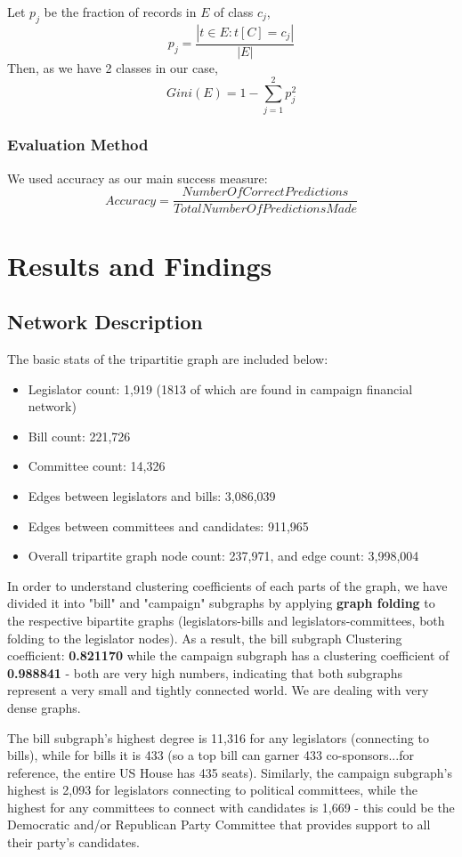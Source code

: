 \documentclass[12pt,twocolumn]{article}
\begin{document}
Let $p_j$ be the fraction of records in $E$ of class $c_j$, $$p_j = \frac{|{t\in E: t[C] = c_j}|}{|E|}$$
Then, as we have 2 classes in our case, $$Gini(E) = 1- \sum_{j=1}^{2}p^2_j$$

\subsubsection{Evaluation Method}
We used accuracy as our main success measure: $$Accuracy = \frac{NumberOfCorrectPredictions}{TotalNumberOfPredictionsMade}$$

\section{Results and Findings}
\subsection{Network Description}
The basic stats of the tripartitie graph are included below: 
\begin{itemize}
\item Legislator count: 1,919 (1813 of which are found in campaign financial network)
\item Bill count: 221,726 
\item Committee count: 14,326
\item Edges between legislators and bills: 3,086,039
\item Edges between committees and candidates: 911,965
\item Overall tripartite graph node count: 237,971, and edge count: 3,998,004
\end{itemize}

In order to understand clustering coefficients of each parts of the graph, we have divided it into "bill" and "campaign" subgraphs by applying \textbf{graph folding} to the respective bipartite graphs (legislators-bills and legislators-committees, both folding to the legislator nodes). As a result, the bill subgraph Clustering coefficient: \textbf{0.821170} while the campaign subgraph has a clustering coefficient of \textbf{0.988841} - both are very high numbers, indicating that both subgraphs represent a very small and tightly connected world. We are dealing with very dense graphs. 

The bill subgraph's highest degree is 11,316 for any legislators (connecting to bills), while for bills it is 433 (so a top bill can garner 433 co-sponsors...for reference, the entire US House has 435 seats). Similarly, the campaign subgraph's highest is 2,093 for legislators connecting to political committees, while the highest for any committees to connect with candidates is 1,669 - this could be the Democratic and/or Republican Party Committee that provides support to all their party's candidates. 
\end{document}
